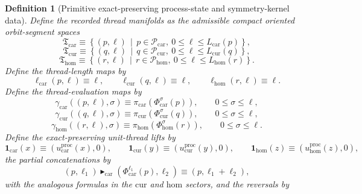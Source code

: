 \documentclass[11pt]{article}
\newcommand{\TensorThreadClass}{\mathfrak T_{\mathrm{car}}}
\newcommand{\CurThreadClass}{\mathfrak T_{\mathrm{cur}}}
\newcommand{\HomThreadClass}{\mathfrak T_{\mathrm{hom}}}
\newcommand{\TensorThreadLength}{\ell_{\mathrm{car}}}
\newcommand{\CurThreadLength}{\ell_{\mathrm{cur}}}
\newcommand{\HomThreadLength}{\ell_{\mathrm{hom}}}
\newcommand{\TensorThreadEval}{\gamma_{\mathrm{car}}}
\newcommand{\CurThreadEval}{\gamma_{\mathrm{cur}}}
\newcommand{\HomThreadEval}{\gamma_{\mathrm{hom}}}
\newcommand{\TensorThreadUnit}{\mathbf 1_{\mathrm{car}}}
\newcommand{\CurThreadUnit}{\mathbf 1_{\mathrm{cur}}}
\newcommand{\HomThreadUnit}{\mathbf 1_{\mathrm{hom}}}
\newcommand{\TensorThreadConcat}{\blacktriangleright_{\mathrm{car}}}
\newcommand{\TensorProcSpace}{\mathcal P_{\mathrm{car}}}
\newcommand{\CurProcSpace}{\mathcal P_{\mathrm{cur}}}
\newcommand{\HomProcSpace}{\mathcal P_{\mathrm{hom}}}
\newcommand{\TensorProcRead}{\pi_{\mathrm{car}}}
\newcommand{\CurProcRead}{\pi_{\mathrm{cur}}}
\newcommand{\HomProcRead}{\pi_{\mathrm{hom}}}
\newcommand{\TensorProcUnit}{u_{\mathrm{car}}^{\mathrm{proc}}}
\newcommand{\CurProcUnit}{u_{\mathrm{cur}}^{\mathrm{proc}}}
\newcommand{\HomProcUnit}{u_{\mathrm{hom}}^{\mathrm{proc}}}
\newcommand{\TensorOrbitFlow}{\Phi_{\mathrm{car}}}
\newcommand{\CurOrbitFlow}{\Phi_{\mathrm{cur}}}
\newcommand{\HomOrbitFlow}{\Phi_{\mathrm{hom}}}
\newcommand{\TensorProcLength}{L_{\mathrm{car}}}
\newcommand{\CurProcLength}{L_{\mathrm{cur}}}
\newcommand{\HomProcLength}{L_{\mathrm{hom}}}
\newtheorem{definition}{Definition}
\begin{document}
\begin{definition}[Primitive exact-preserving process-state and symmetry-kernel data]
Define the recorded thread manifolds as the admissible compact oriented orbit-segment spaces
\begin{equation}
\TensorThreadClass
\equiv
\left\{
(p,\ell)\,\middle|\,
p\in\TensorProcSpace,\ 0\le\ell\le\TensorProcLength(p)
\right\},
\label{eq:thread_from_process_car}
\end{equation}
\begin{equation}
\CurThreadClass
\equiv
\left\{
(q,\ell)\,\middle|\,
q\in\CurProcSpace,\ 0\le\ell\le\CurProcLength(q)
\right\},
\label{eq:thread_from_process_cur}
\end{equation}
\begin{equation}
\HomThreadClass
\equiv
\left\{
(r,\ell)\,\middle|\,
r\in\HomProcSpace,\ 0\le\ell\le\HomProcLength(r)
\right\}.
\label{eq:thread_from_process_hom}
\end{equation}
Define the thread-length maps by
\begin{equation}
\TensorThreadLength(p,\ell)\equiv\ell,\qquad
\CurThreadLength(q,\ell)\equiv\ell,\qquad
\HomThreadLength(r,\ell)\equiv\ell.
\label{eq:thread_lengths}
\end{equation}
Define the thread-evaluation maps by
\begin{equation}
\TensorThreadEval((p,\ell),\sigma)\equiv\TensorProcRead(\TensorOrbitFlow^\sigma(p)),
\qquad
0\le\sigma\le\ell,
\label{eq:thread_eval_car}
\end{equation}
\begin{equation}
\CurThreadEval((q,\ell),\sigma)\equiv\CurProcRead(\CurOrbitFlow^\sigma(q)),
\qquad
0\le\sigma\le\ell,
\label{eq:thread_eval_cur}
\end{equation}
\begin{equation}
\HomThreadEval((r,\ell),\sigma)\equiv\HomProcRead(\HomOrbitFlow^\sigma(r)),
\qquad
0\le\sigma\le\ell.
\label{eq:thread_eval_hom}
\end{equation}
Define the exact-preserving unit-thread lifts by
\begin{equation}
\TensorThreadUnit(x)\equiv(\TensorProcUnit(x),0),\qquad
\CurThreadUnit(y)\equiv(\CurProcUnit(y),0),\qquad
\HomThreadUnit(z)\equiv(\HomProcUnit(z),0),
\label{eq:thread_units}
\end{equation}
the partial concatenations by
\begin{equation}
(p,\ell_1)\TensorThreadConcat(\TensorOrbitFlow^{\ell_1}(p),\ell_2)
\equiv
(p,\ell_1+\ell_2),
\label{eq:thread_concat_car}
\end{equation}
with the analogous formulas in the \(\mathrm{cur}\) and \(\mathrm{hom}\) sectors, and the reversals by

\end{definition}
\end{document}
